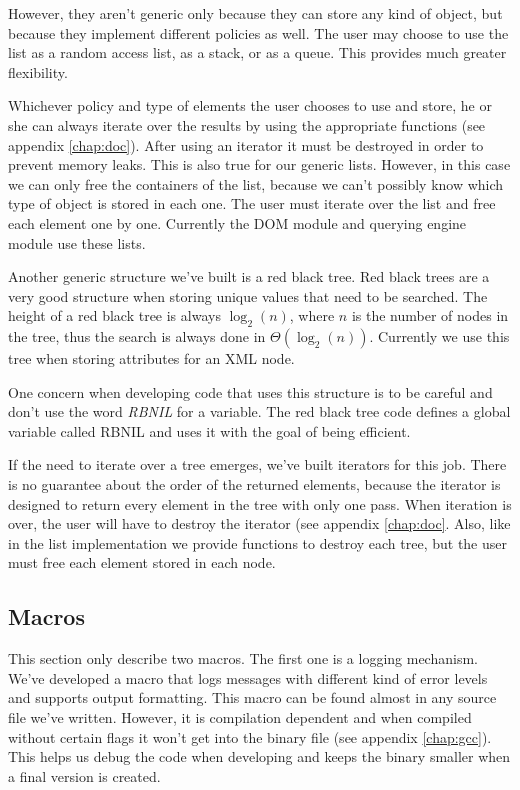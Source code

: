 \documentclass[a4paper]{report}
\begin{document}
		However, they aren't generic only because they can store any kind of object, but because they implement different policies as well. The user may choose to use the list as a random access list, as a stack, or as a 
		queue. This provides much greater flexibility.
		
		Whichever policy and type of elements the user chooses to use and store, he or she can always iterate over the results by using the appropriate functions (see appendix \ref{chap:doc}). After using an iterator it must 
		be destroyed in order to prevent memory leaks. This is also true for our generic lists. However, in this case we can only free the containers of the list, because we can't possibly know which type of object is stored in 
		each one. The user must iterate over the list and free each element one by one. Currently the DOM module and querying engine module use these lists.
		
		Another generic structure we've built is a red black tree. Red black trees are a very good structure when storing unique values that need to be searched. The height of a red black tree is always $\log_2(n)$, where $n$
		is the number of nodes in the tree, thus the search is always done in $\Theta(\log_2(n))$. Currently we use this tree when storing attributes for an XML node.
		
		One concern when developing code that uses this structure is to be careful and don't use the word \emph{RBNIL} for a variable. The red black tree code defines a global variable called RBNIL and uses it with the goal of 
		being efficient.
		
		If the need to iterate over a tree emerges, we've built iterators for this job. There is no guarantee about the order of the returned elements, because the iterator is designed to return every element in the tree with
		only one pass. When iteration is over, the user will have to destroy the iterator (see appendix \ref{chap:doc}. Also, like in the list implementation we provide functions to destroy each tree, but the user must free each
		element stored in each node.
		
	\subsection{Macros}
		This section only describe two macros. The first one is a logging mechanism. We've developed a macro that logs messages with different kind of error levels and supports output formatting. This macro can be found
		almost in any source file we've written. However, it is compilation dependent and when compiled without certain flags it won't get into the binary file (see appendix \ref{chap:gcc}). This helps us debug the code when
		developing and keeps the binary smaller when a final version is created.
		
\end{document}
